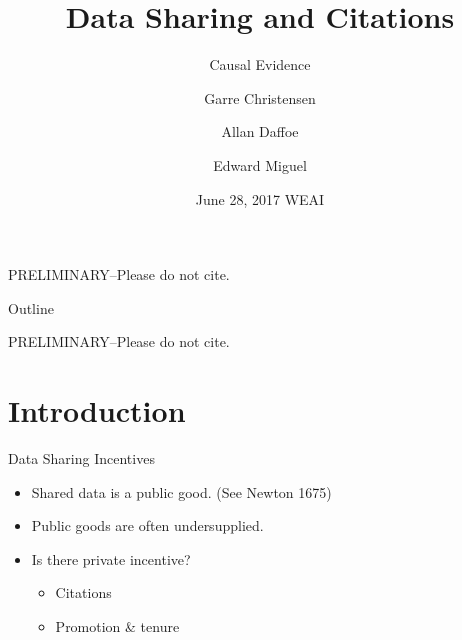 \documentclass{beamer}
\title[Data Sharing and Citations] %
{Data Sharing and Citations}
\subtitle
{Causal Evidence} %
\author[Christense, Dafoe, Miguel] %
{Garre Christensen\inst{1} \and Allan Daffoe\inst{2} \and Edward Miguel\inst{3}}
\institute[Universities of Somewhere and Elsewhere] %
{
  \inst{1}%
  Berkeley Institute for Data Science, UC Berkeley
  \and
  \inst{2}%
  Department of Political Science, Yale University
  \and
  \inst{3}%
  Department of Economics, UC Berkeley}
\date[Short Occasion] %
{June 28, 2017 WEAI}
\begin{document}
\begin{frame}
  \titlepage
  \begin{center}
  \begin{large}
  PRELIMINARY--Please do not cite.
  \end{large}
  \end{center}
\end{frame}

\begin{frame}{Outline}
  \tableofcontents
  \begin{center}
  \begin{large}
  PRELIMINARY--Please do not cite.
  \end{large}
  \end{center}
\end{frame}




\section{Introduction}

\begin{frame}{Data Sharing Incentives}{}

  \begin{itemize}
  \item
    Shared data is a public good. (See Newton 1675)
  \item
    Public goods are often undersupplied.
  \item 
  	 Is there private incentive?
  	 \begin{itemize}
  	 \item Citations
  	 \item Promotion \& tenure
  	 \end{itemize} 
  \end{itemize}
\end{frame}
\end{document}

